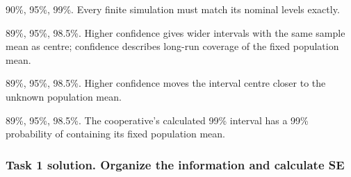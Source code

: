 \begin{answeroptions}
    \item 90\%, 95\%, 99\%. Every finite simulation must match its nominal levels exactly.
    \item 89\%, 95\%, 98.5\%. Higher confidence gives wider intervals with the same sample mean as centre; confidence describes long-run coverage of the fixed population mean.
    \item 89\%, 95\%, 98.5\%. Higher confidence moves the interval centre closer to the unknown population mean.
    \item 89\%, 95\%, 98.5\%. The cooperative's calculated 99\% interval has a 99\% probability of containing its fixed population mean.
\end{answeroptions}

\clearpage
\subsubsection*{Task 1 solution. Organize the information and calculate SE}
\label{sol:c2-compare-three-a}

